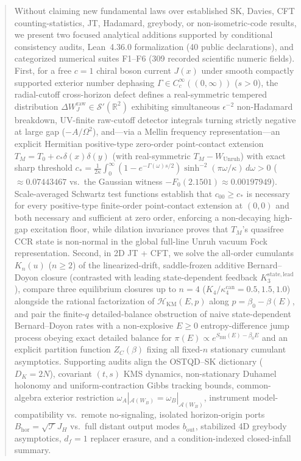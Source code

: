 \documentclass[11pt,a4paper]{article}
\theoremstyle{definition}
\theoremstyle{remark}
\newcommand{\cA}{\mathcal{A}}
\newcommand{\cT}{\mathcal{T}}
\newcommand{\bbR}{\mathbb{R}}
\newcommand{\1}{\mathbf{1}}
\begin{document}
\begin{abstract}
Without claiming new fundamental laws over established SK, Davies, CFT counting-statistics, JT, Hadamard, greybody, or non-isometric-code results, we present two focused analytical additions supported by conditional consistency audits, Lean~4.36.0 formalization (40 public declarations), and categorized numerical suites F1--F6 (309 recorded scientific numeric fields).
First, for a free $c=1$ chiral boson current $J(x)$ under smooth compactly supported exterior number dephasing $\Gamma\in C_c^\infty((0,\infty))$ ($s>0$), the radial-cutoff cross-horizon defect defines a real-symmetric tempered distribution $\Delta W_J^{\mathrm{raw}}\in\mathcal{S}'(\bbR^2)$ exhibiting simultaneous $\epsilon^{-2}$ non-Hadamard breakdown, UV-finite raw-cutoff detector integrals turning strictly negative at large gap ($-A/\Omega^2$), and---via a Mellin frequency representation---an explicit Hermitian positive-type zero-order point-contact extension $T_M = T_0 + c_*\delta(x)\delta(y)$ (with real-symmetric $T_M-W_{\mathrm{Unruh}}$) with exact sharp threshold $c_* = \frac{1}{2\kappa}\int_0^\infty (1-e^{-\Gamma(\omega)s/2})\sinh^{-2}(\pi\omega/\kappa)\,d\omega > 0$ ($\approx 0.07443467$ vs.\ the Gaussian witness $-F_0(2.1501)\approx 0.00197949$). Scale-averaged Schwartz test functions establish that $c_{00}\ge c_*$ is necessary for every positive-type finite-order point-contact extension at $(0,0)$ and both necessary and sufficient at zero order, enforcing a non-decaying high-gap excitation floor, while dilation invariance proves that $T_M$'s quasifree CCR state is non-normal in the global full-line Unruh vacuum Fock representation.
Second, in 2D JT + CFT, we solve the all-order cumulants $K_n(u)$ ($n\ge 2$) of the linearized-drift, saddle-frozen additive Bernard--Doyon closure (contrasted with leading state-dependent feedback $K_3^{\mathrm{state,lead}}$), compare three equilibrium closures up to $n=4$ ($K_4/\kappa_4^{\mathrm{can}}=0.5, 1.5, 1.0$) alongside the rational factorization of $\mathcal{H}_{\mathrm{KM}}(E,p)$ along $p=\beta_0-\beta(E)$, and pair the finite-$q$ detailed-balance obstruction of naive state-dependent Bernard--Doyon rates with a non-explosive $E\ge 0$ entropy-difference jump process obeying exact detailed balance for $\pi(E)\propto e^{S_{\mathrm{BH}}(E)-\beta_0 E}$ and an explicit partition function $Z_C(\beta)$ fixing all fixed-$n$ stationary cumulant asymptotics.
Supporting audits align the OSTQD--SK dictionary ($D_K=2N$), covariant $(t,s)$ KMS dynamics, non-stationary Duhamel holonomy and uniform-contraction Gibbs tracking bounds, common-algebra exterior restriction $\omega_A|_{\cA(W_B)}=\omega_B|_{\cA(W_B)}$, instrument model-compatibility vs.\ remote no-signaling, isolated horizon-origin ports $B_{\mathrm{hor}}=\sqrt{\cT}J_H$ vs.\ full distant output modes $b_{\mathrm{out}}$, stabilized 4D greybody asymptotics, $d_f=1$ replacer erasure, and a condition-indexed closed-infall summary.
\end{abstract}
\end{document}

